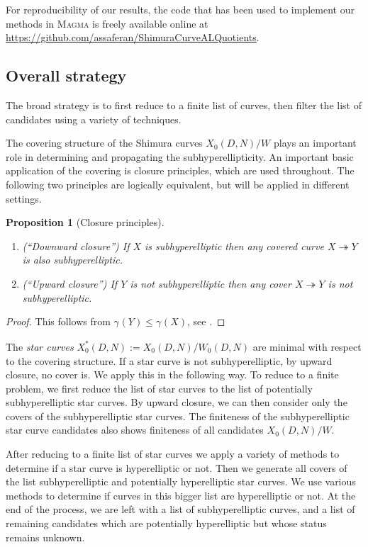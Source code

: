 \documentclass[12pt]{amsart}
\numberwithin{equation}{subsection}
\theoremstyle{plain}\newtheorem{ithm}{Theorem}
\theoremstyle{plain}\newtheorem{iprop}[ithm]{Proposition}
\newtheorem{proposition}[equation]{Proposition}
\theoremstyle{definition}
\theoremstyle{remark}
\newcommand{\Curve}[2]{X_0({#1},{#2})} %
\newcommand{\StarCurve}[2]{X_0^*({#1},{#2})} %
\newcommand{\ALfull}[2]{W_0({#1},{#2})} %
\newcommand{\gon}[2]{\gamma_{#2}(#1)}
\newcommand{\defi}[1]{\emph{#1}} %
\newcommand{\Magma}{\textsc{Magma}}
\begin{document}
For reproducibility of our results, the code that has been used to implement our methods in \Magma{} \cite{Magma} is freely available online at \url{https://github.com/assaferan/ShimuraCurveALQuotients}. 


\subsection{Overall strategy}

The broad strategy is to first reduce to a finite list of curves, then filter the list of candidates using a variety of techniques.


The covering structure of the Shimura curves $\Curve{D}{N}/W$ plays an important role in determining and propagating the subhyperellipticity.
An important basic application of the covering is closure principles, which are used throughout. The following two principles are logically equivalent, but will be applied in different settings.
\begin{proposition}[Closure principles]
\label{def:closure}
\hfill
\begin{enumerate}
\item (``Downward closure'')  If $X$ is subhyperelliptic then any covered curve $X \twoheadrightarrow Y$ is also subhyperelliptic.
\item (``Upward closure'') If $Y$ is not subhyperelliptic then any cover $X \twoheadrightarrow Y$ is not subhyperelliptic.
\end{enumerate}
\end{proposition}

\begin{proof}
    This follows from $\gon{Y}{} \le \gon{X}{}$, see \cite[Prop. A.1.(vii)]{Poonen}.
\end{proof}

The \defi{star curves} $\StarCurve{D}{N} := \Curve{D}{N}/\ALfull{D}{N}$ are minimal with respect to the covering structure.
If a star curve is not subhyperelliptic, by upward closure, no cover  is.
We apply this in the following way. To reduce to a finite problem, we first reduce the list of star curves to the list of potentially subhyperelliptic star curves. 
By upward closure, we can then consider only the covers of the subhyperelliptic star curves. The finiteness of the subhyperelliptic star curve candidates also shows  finiteness of all candidates $\Curve{D}{N}/W$.

After reducing to a finite list of star curves we apply a variety of methods to determine if a star curve is hyperelliptic or not. 
Then we generate all covers of the  list subhyperelliptic and potentially hyperelliptic star curves.  
We use various methods to determine if curves in this bigger list are hyperelliptic or not.
At the end of the process, we are left with a list of subhyperelliptic curves, and a list of remaining candidates which are potentially hyperelliptic but whose status remains unknown.
\end{document}
